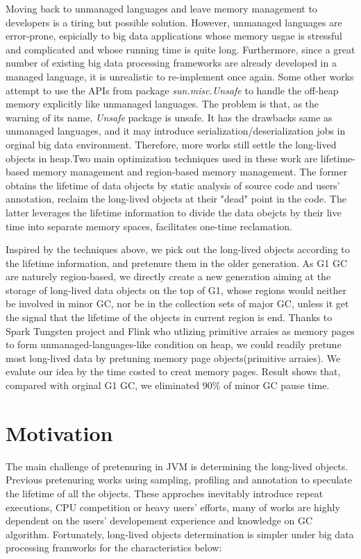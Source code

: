 \documentclass[sigplan, screen]{acmart}
\begin{document}
Moving back to unmanaged languages and leave memory management to developers is a tiring but possible solution\cite{chenSM,maas2017return}. However, unmanaged languages are error-prone,
espicially to big data applications whose memory usgae is stressful and complicated and whose running time is quite long. Furthermore, since a great number of existing
big data processing frameworks are already developed in a managed language, it is unrealistic to re-implement once again\cite{nguyen2015facade,bruno2018study}. Some other works
 attempt to use the APIs from package \emph{sun.misc.Unsafe} to handle the off-heap memory explicitly like unmanaged languages\cite{mastrangelo2015use,navasca2019gerenuk,nguyen2015facade}.
 The problem is that, as the warning of its name, \emph{Unsafe} package is unsafe. It has the drawbacks same as unmanaged languages, and it may introduce serialization/deserialization
 jobs in orginal big data environment. Therefore, more works still settle the long-lived objects in heap.Two main optimization techniques used in these work are lifetime-based 
 memory management and region-based memory management. The former obtains the lifetime of data objects by static analysis of source code and users' annotation, reclaim the 
 long-lived objects at their "dead" point in the code. The latter leverages the lifetime information to divide the data obejcts by their live time into separate memory spaces, 
 facilitates one-time reclamation\cite{lu2016lifetime,kolokasis2020say,nguyen2016yak,cohen2015data,wang2019panthera}. 
 
Inspired by the techniques above, we pick out the long-lived objects according to the lifetime information, and pretenure them in the older generation. As G1 GC are naturely region-based,
we directly create a new generation aiming at the storage of long-lived data objects on the top of G1, whose regions would neither be involved in minor GC, nor be in the collection sets of major GC, unless it get the signal that the lifetime of the objects in current region is end. 
Thanks to Spark Tungsten\cite{Tungsten} project and Flink who utlizing primitive arraies as memory
pages to form unmanaged-languages-like condition on heap, we could readily pretune most long-lived data by pretuning memory page objects(primitive arraies). We evalute our idea 
by the time costed to creat memory pages. Result shows that, compared with orginal G1 GC, we eliminated 90$\%$ of minor GC pause time.

\section{Motivation}
The main challenge of pretenuring in JVM is determining the long-lived objects. Previous pretenuring works using sampling\cite{harris2000dynamic,jump2004dynamic}, profiling\cite{blackburn2001pretenuring,bruno2019runtime,bruno2017polm2} 
and annotation\cite{bruno2017ng2c} to speculate the lifetime of all the objects. These approches inevitably introduce repeat executions, CPU competition or heavy users' efforts, many of works are highly dependent on the users' developement experience
and knowledge on GC algorithm. Fortunately, long-lived objects determination is simpler under big data processing framworks for the characteristics below:
\end{document}
